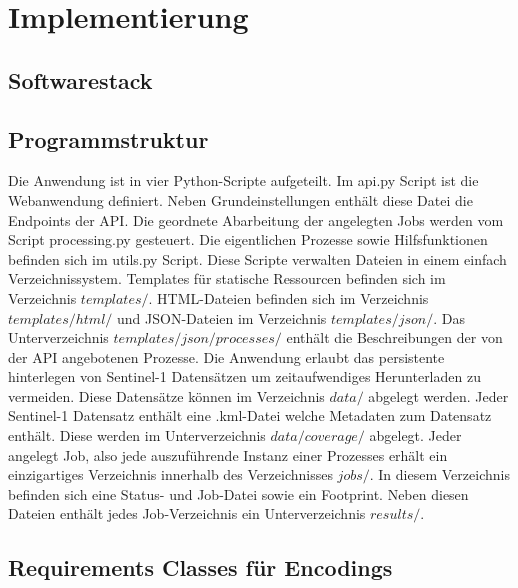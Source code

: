 \newpage
\restoregeometry
\section{Implementierung}
\subsection{Softwarestack}
\subsection{Programmstruktur}
Die Anwendung ist in vier Python-Scripte aufgeteilt. Im api.py Script ist die Webanwendung definiert. Neben Grundeinstellungen enthält diese Datei
die Endpoints der API. Die geordnete Abarbeitung der angelegten Jobs werden vom Script processing.py gesteuert. Die eigentlichen Prozesse sowie 
Hilfsfunktionen befinden sich im utils.py Script.
Diese Scripte verwalten Dateien in einem einfach Verzeichnissystem. Templates für statische Ressourcen befinden sich im Verzeichnis $templates/$. HTML-Dateien 
befinden sich im Verzeichnis $templates/html/$ und JSON-Dateien im Verzeichnis $templates/json/$. Das Unterverzeichnis $templates/json/processes/$ enthält die 
Beschreibungen der von der API angebotenen Prozesse. Die Anwendung erlaubt das persistente hinterlegen von Sentinel-1 Datensätzen um zeitaufwendiges 
Herunterladen zu vermeiden. Diese Datensätze können im Verzeichnis $data/$ abgelegt werden. Jeder Sentinel-1 Datensatz enthält eine .kml-Datei welche 
Metadaten zum Datensatz enthält. Diese werden im Unterverzeichnis $data/coverage/$ abgelegt. 
Jeder angelegt Job, also jede auszuführende Instanz einer Prozesses erhält ein einzigartiges Verzeichnis innerhalb des Verzeichnisses $jobs/$. In diesem 
Verzeichnis befinden sich eine Status- und Job-Datei sowie ein Footprint. Neben diesen Dateien enthält jedes Job-Verzeichnis ein Unterverzeichnis $results/$.  


\subsection{Requirements Classes für Encodings}
